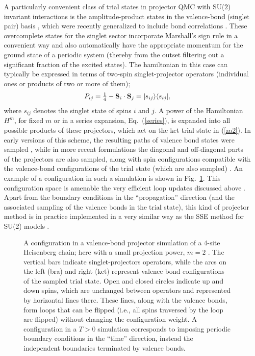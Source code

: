 \documentclass[range]{ar2e}
\begin{document}
A particularly convenient class of trial states in projector QMC with SU($2$) invariant interactions is the amplitude-product states in the valence-bond
(singlet pair) basis \cite{Liang88}, which were recently generalized to include bond correlations \cite{Lin12}. These overcomplete states for the singlet 
sector incorporate Marshall's sign rule in a convenient way and also automatically have the appropriate momentum for the ground state of a periodic system 
(thereby from the outset filtering out a significant fraction of the excited states). The hamiltonian in this case can typically be expressed in terms of 
two-spin singlet-projector operators  (individual ones or products of two or more of them);
\begin{equation}
P_{ij}=\hbox{$\frac{1}{4}$}-{\bf S}_i\cdot {\bf S}_j = |s_{ij}\rangle\langle s_{ij}|,
\label{psinglet}
\end{equation}
where $s_{ij}$ denotes the singlet state of spins $i$ and $j$. A power of the Hamiltonian $H^m$, for fixed $m$ or in a series expansion, Eq.~(\ref{series}),
is expanded into all possible products of these projectors, which act on the ket trial state in (\ref{za2}). In early versions of this scheme, the resulting 
paths of valence bond states were sampled \cite{Liang90,Santoro99,Sandvik05}, while in more recent formulations the diagonal and off-diagonal parts of the 
projectors are also sampled, along with spin configurations compatible with the valence-bond configurations of the trial state (which are also sampled) 
\cite{Sandvik10c}. An example of a configuration in such a simulation is shown in Fig.~\ref{loops}. This configuration space is amenable the very efficient 
loop updates discussed above \cite{Sandvik10a}. Apart from the boundary conditions in the ``propagation'' direction (and the associated sampling of the
valence bonds in the trial state), this kind of projector method is in practice implemented in a very similar way as the SSE method for SU($2$) 
models \cite{Sandvik10b}.

\begin{figure}
\centerline{}
\caption{A configuration in a valence-bond projector simulation of a 4-site Heisenberg chain; here with a small projection power, 
$m=2$ \cite{Sandvik10a}. The vertical bars indicate singlet-projectors operators, while the arcs on the left (bra) and right (ket) represent 
valence bond configurations of the sampled trial state. Open and closed circles indicate up and down spins, which are unchanged between 
operators and represented by horizontal lines there. These lines, along with the valence bonds, form loops that can be flipped (i.e., 
all spins traversed by the loop are flipped) without changing the configuration weight. A configuration in a $T>0$ simulation corresponds 
to imposing periodic boundary conditions in the ``time'' direction, instead the independent boundaries terminated by valence bonds.}
\label{loops}
\end{figure}
\end{document}
